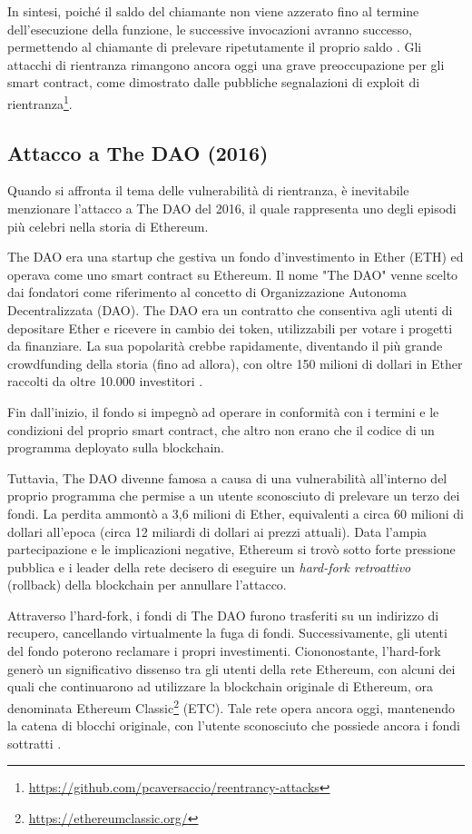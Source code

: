 In sintesi, poiché il saldo del chiamante non viene azzerato fino al termine dell'esecuzione della funzione, le successive invocazioni avranno successo, 
permettendo al chiamante di prelevare ripetutamente il proprio saldo \cite{ethereumsecurity}. Gli attacchi di rientranza rimangono ancora oggi una grave 
preoccupazione per gli smart contract, come dimostrato dalle pubbliche segnalazioni di exploit di 
rientranza\footnote{\url{https://github.com/pcaversaccio/reentrancy-attacks}}.

\subsection{Attacco a The DAO (2016)}\label{subsec:theDAO}
Quando si affronta il tema delle vulnerabilità di rientranza, è inevitabile menzionare l'attacco a The DAO del 2016, il quale rappresenta uno degli episodi 
più celebri nella storia di Ethereum.

The DAO era una startup che gestiva un fondo d'investimento in Ether (ETH) ed operava come uno smart contract su Ethereum. Il nome "The DAO" venne scelto 
dai fondatori come riferimento al concetto di Organizzazione Autonoma Decentralizzata (DAO). The DAO era un contratto che consentiva agli utenti di 
depositare Ether e ricevere in cambio dei token, utilizzabili per votare i progetti da finanziare. La sua popolarità crebbe rapidamente, diventando il 
più grande crowdfunding della storia (fino ad allora), con oltre 150 milioni di dollari in Ether raccolti da oltre 10.000 investitori \cite{daoattack}.

Fin dall'inizio, il fondo si impegnò ad operare in conformità con i termini e le condizioni del proprio smart contract, che altro non erano che il codice 
di un programma deployato sulla blockchain. 

Tuttavia, The DAO divenne famosa a causa di una vulnerabilità all'interno del proprio programma che permise a un utente sconosciuto di prelevare un terzo 
dei fondi. La perdita ammontò a 3,6 milioni di Ether, equivalenti a circa 60 milioni di dollari all'epoca (circa 12 miliardi di dollari ai prezzi attuali). 
Data l'ampia partecipazione e le implicazioni negative, Ethereum si trovò sotto forte pressione pubblica e i leader della rete decisero di eseguire un 
\textit{hard-fork retroattivo} (rollback) della blockchain per annullare l'attacco.

Attraverso l'hard-fork, i fondi di The DAO furono trasferiti su un indirizzo di recupero, cancellando virtualmente la fuga di fondi. Successivamente, 
gli utenti del fondo poterono reclamare i propri investimenti. Ciononostante, l'hard-fork generò un significativo dissenso tra gli utenti della rete Ethereum, 
con alcuni dei quali che continuarono ad utilizzare la blockchain originale di Ethereum, ora denominata Ethereum 
Classic\footnote{\url{https://ethereumclassic.org/}} (ETC). Tale rete opera ancora oggi, mantenendo la catena di blocchi originale, con l'utente 
sconosciuto che possiede ancora i fondi sottratti \cite{daoattackhistory}.

